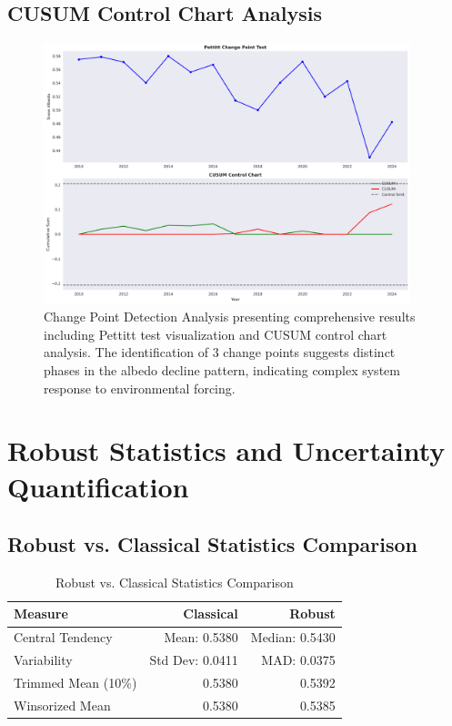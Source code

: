 \documentclass[12pt,a4paper]{article}
\begin{document}
\subsection{CUSUM Control Chart Analysis}

\begin{figure}[H]
\centering
\includegraphics[width=0.95\textwidth]{statistical_analysis/change_point_analysis.png}
\caption{Change Point Detection Analysis presenting comprehensive results including Pettitt test visualization and CUSUM control chart analysis. The identification of 3 change points suggests distinct phases in the albedo decline pattern, indicating complex system response to environmental forcing.}
\label{fig:change_point_analysis}
\end{figure}

\section{Robust Statistics and Uncertainty Quantification}

\subsection{Robust vs. Classical Statistics Comparison}

\begin{table}[H]
\centering
\caption{Robust vs. Classical Statistics Comparison}
\label{tab:robust_comparison}
\begin{tabular}{@{}lrr@{}}
\toprule
\textbf{Measure} & \textbf{Classical} & \textbf{Robust} \\
\midrule
Central Tendency & Mean: 0.5380 & Median: 0.5430 \\
Variability & Std Dev: 0.0411 & MAD: 0.0375 \\
Trimmed Mean (10\%) & 0.5380 & 0.5392 \\
Winsorized Mean & 0.5380 & 0.5385 \\
\bottomrule
\end{tabular}
\end{table}
\end{document}
